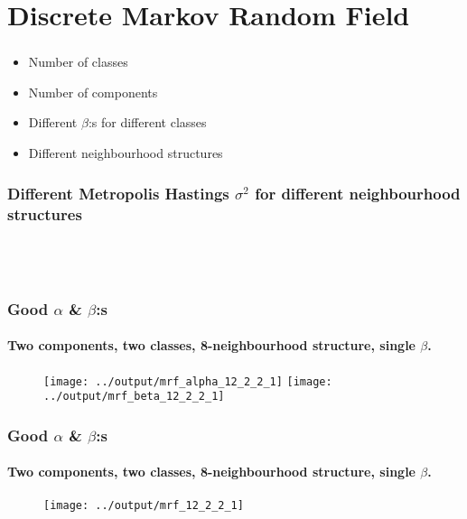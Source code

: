 \documentclass[12pt, english]{beamer}
\begin{document}
\section{Discrete Markov Random Field}
\begin{frame}
  \frametitle{}
  \framesubtitle{}

  \begin{block}{}
  \begin{itemize}
    \item Number of classes
    \item Number of components
    \item Different $\beta$:s for different classes
    \item Different neighbourhood structures
  \end{itemize}
  \end{block}

\end{frame}


\begin{frame}
  \frametitle{Different Metropolis Hastings $\sigma^2$ for different neighbourhood structures}
  \framesubtitle{}

\begin{table}
  \centering
  \begin{tabular}{c c c |}
    
  \end{tabular}
    \begin{tabular}{c c c}
    
  \end{tabular}
  \caption*{}
  \label{tab:sigma:n1}
\end{table}

\end{frame}

\begin{frame}
  \frametitle{Good $\alpha$ \& $\beta$:s}
  \framesubtitle{Two components, two classes, 8-neighbourhood structure, single $\beta$.}

\begin{figure}
\centering
\texttt{[image: ../output/mrf\_alpha\_12\_2\_2\_1]}
\texttt{[image: ../output/mrf\_beta\_12\_2\_2\_1]}
    \caption*{}
    \label{fig:alphabeta}
\end{figure}
\end{frame}

\begin{frame}
  \frametitle{Good $\alpha$ \& $\beta$:s}
  \framesubtitle{Two components, two classes, 8-neighbourhood structure, single $\beta$.}

\begin{figure}
\centering
\texttt{[image: ../output/mrf\_12\_2\_2\_1]}
    \caption*{}
    \label{fig:mrf}
\end{figure}
\end{frame}
\end{document}
